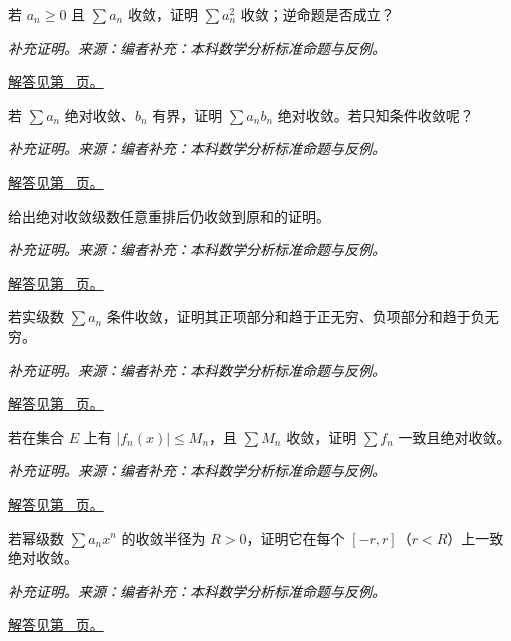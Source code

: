 \documentclass[12pt,fontset=fandol]{ctexart}
\begin{document}
\begin{example}[正项收敛与平方级数]\label{ex:c29q7}
若 $a_n\ge0$ 且 $\sum a_n$ 收敛，证明 $\sum a_n^2$ 收敛；逆命题是否成立？
\par\textit{补充证明。来源：编者补充：本科数学分析标准命题与反例。}\par\hyperref[ans:c29q7]{解答见第~\pageref{ans:c29q7} 页。}
\end{example}
\begin{example}[收敛级数乘有界因子]\label{ex:c29q8}
若 $\sum a_n$ 绝对收敛、$b_n$ 有界，证明 $\sum a_nb_n$ 绝对收敛。若只知条件收敛呢？
\par\textit{补充证明。来源：编者补充：本科数学分析标准命题与反例。}\par\hyperref[ans:c29q8]{解答见第~\pageref{ans:c29q8} 页。}
\end{example}
\begin{example}[绝对收敛级数的重排]\label{ex:c29q9}
给出绝对收敛级数任意重排后仍收敛到原和的证明。
\par\textit{补充证明。来源：编者补充：本科数学分析标准命题与反例。}\par\hyperref[ans:c29q9]{解答见第~\pageref{ans:c29q9} 页。}
\end{example}
\begin{example}[条件收敛级数的正负部分]\label{ex:c29q10}
若实级数 $\sum a_n$ 条件收敛，证明其正项部分和趋于正无穷、负项部分和趋于负无穷。
\par\textit{补充证明。来源：编者补充：本科数学分析标准命题与反例。}\par\hyperref[ans:c29q10]{解答见第~\pageref{ans:c29q10} 页。}
\end{example}
\begin{example}[Weierstrass 判别]\label{ex:c29q11}
若在集合 $E$ 上有 $|f_n(x)|\le M_n$，且 $\sum M_n$ 收敛，证明 $\sum f_n$ 一致且绝对收敛。
\par\textit{补充证明。来源：编者补充：本科数学分析标准命题与反例。}\par\hyperref[ans:c29q11]{解答见第~\pageref{ans:c29q11} 页。}
\end{example}
\begin{example}[幂级数在小闭区间上一致收敛]\label{ex:c29q12}
若幂级数 $\sum a_nx^n$ 的收敛半径为 $R>0$，证明它在每个 $[-r,r]$（$r<R$）上一致绝对收敛。
\par\textit{补充证明。来源：编者补充：本科数学分析标准命题与反例。}\par\hyperref[ans:c29q12]{解答见第~\pageref{ans:c29q12} 页。}
\end{example}
\end{document}
